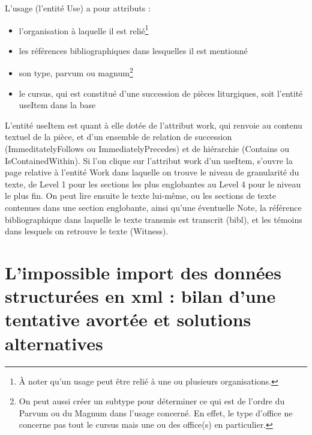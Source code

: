 \documentclass[a4paper,12pt,twoside]{book}
\begin{document}
    L'usage (l'entité \og Use\fg{}) a pour attributs :
    \begin{itemize}
        \item l'organisation à laquelle il est relié\footnote{À noter qu'un usage peut être relié à une ou plusieurs organisations.}
        \item les références bibliographiques dans lesquelles il est mentionné
        \item son type, \og parvum\fg{} ou \og magnum\fg{}\footnote{On peut aussi créer un \og subtype\fg{} pour déterminer ce qui est de l’ordre du \og Parvum\fg{} ou du \og Magnum\fg{} dans l’usage concerné. En effet, le type d’office ne concerne pas tout le cursus mais une ou des office(s) en particulier.}
        \item le cursus, qui est constitué d'une succession de pièces liturgiques, soit l'entité \og useItem\fg{} dans la base
    \end{itemize}
    
    L'entité \og useItem\fg{} est quant à elle dotée de l'attribut \og work\fg{}, qui renvoie au contenu textuel de la pièce, et d'un ensemble de relation de succession (\og ImmeditatelyFollows\fg{} ou \og ImmediatelyPrecedes\fg{}) et de hiérarchie (\og Contains\fg{} ou \og IsContainedWithin\fg{}). Si l'on clique sur l'attribut \og work\fg{} d'un \og useItem\fg{}, s'ouvre la page relative à l'entité \og Work\fg{} dans laquelle on trouve le niveau de granularité du texte, de \og Level 1\fg{} pour les sections les plus englobantes au \og Level 4\fg{} pour le niveau le plus fin. On peut lire ensuite le texte lui-même, ou les sections de texte contenues dans une section englobante, ainsi qu'une éventuelle \og Note\fg{}, la référence bibliographique dans laquelle le texte transmis est transcrit (\og bibl\fg{}), et les témoins dans lesquels on retrouve le texte (\og Witness\fg{}). 
    
    
	\section{L’impossible import des données structurées en xml : bilan d’une tentative avortée et solutions alternatives}
	
\end{document}
